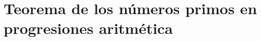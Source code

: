 
\thispagestyle{empty}
\vspace{-0.5cm}


\lipsum

\section{Teorema de los números primos en progresiones aritmética}